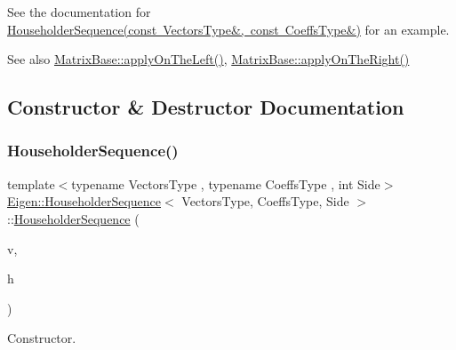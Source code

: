 See the documentation for \mbox{\hyperlink{class_eigen_1_1_householder_sequence_af6aeede87ed8dac452f4fa8b4f45c3f2}{Householder\+Sequence(const Vectors\+Type\&, const Coeffs\+Type\&)}} for an example.

\begin{DoxySeeAlso}{See also}
\mbox{\hyperlink{class_eigen_1_1_matrix_base_a3a08ad41e81d8ad4a37b5d5c7490e765}{Matrix\+Base\+::apply\+On\+The\+Left()}}, \mbox{\hyperlink{class_eigen_1_1_matrix_base_a45d91752925d2757fc8058a293b15462}{Matrix\+Base\+::apply\+On\+The\+Right()}} 
\end{DoxySeeAlso}


\subsection{Constructor \& Destructor Documentation}
\mbox{\label{class_eigen_1_1_householder_sequence_af6aeede87ed8dac452f4fa8b4f45c3f2}} 
\subsubsection{\texorpdfstring{HouseholderSequence()}{HouseholderSequence()}}
{\footnotesize\ttfamily template$<$typename Vectors\+Type , typename Coeffs\+Type , int Side$>$ \\
\mbox{\hyperlink{class_eigen_1_1_householder_sequence}{Eigen\+::\+Householder\+Sequence}}$<$ Vectors\+Type, Coeffs\+Type, Side $>$\+::\mbox{\hyperlink{class_eigen_1_1_householder_sequence}{Householder\+Sequence}} (\begin{DoxyParamCaption}\item[{const Vectors\+Type \&}]{v,  }\item[{const Coeffs\+Type \&}]{h }\end{DoxyParamCaption})\hspace{0.3cm}{\ttfamily [inline]}}



Constructor. 


